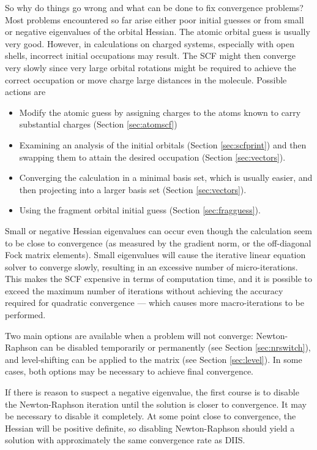 So why do things go wrong and what can be done to fix convergence
problems?  Most problems encountered so far arise either poor initial
guesses or from small or negative eigenvalues of the orbital Hessian.
The atomic orbital guess is usually very good.  However, in
calculations on charged systems, especially with open shells,
incorrect initial occupations may result.  The SCF might then converge
very slowly since very large orbital rotations might be required to
achieve the correct occupation or move charge large distances in the
molecule.  Possible actions are
\begin{itemize}
\item Modify the atomic guess by assigning charges to the atoms
  known to carry substantial charges (Section \ref{sec:atomscf})
\item Examining an analysis of the initial orbitals (Section
  \ref{sec:scfprint}) and then swapping them to attain the desired
  occupation (Section \ref{sec:vectors}).
\item Converging the calculation in a minimal basis set, which is
  usually easier, and then projecting into a larger basis set (Section
  \ref{sec:vectors}).
\item Using the fragment orbital initial guess (Section
  \ref{sec:fragguess}).
\end{itemize}

Small or negative Hessian eigenvalues can occur even though the
calculation seem to be close to convergence (as measured by the
gradient norm, or the off-diagonal Fock matrix elements).  Small
eigenvalues will cause the iterative linear equation solver to
converge slowly, resulting in an excessive number of micro-iterations.
This makes the SCF expensive in terms of computation time, and it is
possible to exceed the maximum number of iterations without achieving
the accuracy required for quadratic convergence --- which causes more
macro-iterations to be performed. 

Two main options are available when a problem will not converge:
Newton-Raphson can be disabled temporarily or permanently (see Section
\ref{sec:nrswitch}), and level-shifting can be applied to the matrix
(see Section \ref{sec:level}).  In some cases, both options may be
necessary to achieve final convergence.

If there is reason to suspect a negative eigenvalue, the first course
is to disable the Newton-Raphson iteration until the solution is
closer to convergence.  It may be necessary to disable it completely.
At some point close to convergence, the Hessian will be positive
definite, so disabling Newton-Raphson should yield a solution with
approximately the same convergence rate as DIIS.

